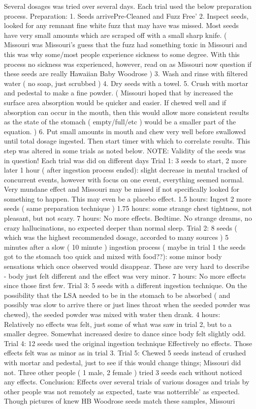 \documentclass[12pt]{book}
\begin{document}
Several dosages was tried over several days. Each trial used the below preparation process. Preparation: 1. Seeds arrivePre-Cleaned and Fuzz Free' 2. Inspect seeds, looked for any remnant fine white fuzz that may have was missed. Most seeds have very small amounts which are scraped off with a small sharp knife. ( Missouri was Missouri's guess that the fuzz had something toxic in Missouri and this was why some/most people experience sickness to some degree. With this process no sickness was experienced, however, read on as Missouri now question if these seeds are really Hawaiian Baby Woodrose ) 3. Wash and rinse with filtered water ( no soap, just scrubbed ) 4. Dry seeds with a towel. 5. Crush with mortar and pedestal to make a fine powder. ( Missouri hoped that by increased the surface area absorption would be quicker and easier. If chewed well and if absorption can occur in the mouth, then this would allow more consistent results as the state of the stomach ( empty/full/etc ) would be a smaller part of the equation. ) 6. Put small amounts in mouth and chew very well before swallowed until total dosage ingested. Then start timer with which to correlate results. This step was altered in some trials as noted below. NOTE: Validity of the seeds was in question! Each trial was did on different days Trial 1: 3 seeds to start, 2 more later 1 hour ( after ingestion process ended): slight decrease in mental tracked of concurrent events, however with focus on one event, everything seemed normal. Very mundane effect and Missouri may be missed if not specifically looked for something to happen. This may even be a placebo effect. 1.5 hours: Ingest 2 more seeds ( same preparation technique ) 1.75 hours: some strange chest tightness, not pleasant, but not scary. 7 hours: No more effects. Bedtime. No strange dreams, no crazy hallucinations, no expected deeper than normal sleep. Trial 2: 8 seeds ( which was the highest recommended dosage, accorded to many sources ) 5 minutes after a slow ( 10 minute ) ingestion process ( maybe in trial 1 the seeds got to the stomach too quick and mixed with food??): some minor body sensations which once observed would disappear. These are very hard to describe - body just felt different and the effect was very minor. 7 hours: No more effects since those first few. Trial 3: 5 seeds with a different ingestion technique. On the possibility that the LSA needed to be in the stomach to be absorbed ( and possibly was slow to arrive there or just lines throat when the seeded powder was chewed), the seeded powder was mixed with water then drank. 4 hours: Relatively no effects was felt, just some of what was saw in trial 2, but to a smaller degree. Somewhat increased desire to dance since body felt slightly odd. Trial 4: 12 seeds used the original ingestion technique Effectively no effects. Those effects felt was as minor as in trial 3. Trial 5: Chewed 5 seeds instead of crushed with mortar and pedestal, just to see if this would change things; Missouri did not. Three other people ( 1 male, 2 female ) tried 3 seeds each without noticed any effects. Conclusion: Effects over several trials of various dosages and trials by other people was not remotely as expected, taste was notterrible' as expected. Though pictures of knew HB Woodrose seeds match these samples, Missouri 
\end{document}
